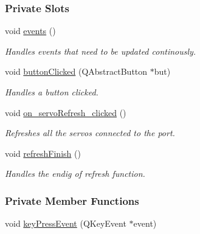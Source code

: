 \subsubsection*{Private Slots}
\begin{DoxyCompactItemize}
\item 
void \hyperlink{a00006_a18763ff318688083c7ee5a21f22e8e98}{events} ()
\begin{DoxyCompactList}\small\item\em Handles events that need to be updated continously. \end{DoxyCompactList}\item 
void \hyperlink{a00006_a1f7d6790701ff9b1301533b8ad045ede}{button\+Clicked} (Q\+Abstract\+Button $\ast$but)
\begin{DoxyCompactList}\small\item\em Handles a button clicked. \end{DoxyCompactList}\item 
void \hyperlink{a00006_ad5365d452e8bcd86cbb64b9ec42c3b7e}{on\+\_\+servo\+Refresh\+\_\+clicked} ()
\begin{DoxyCompactList}\small\item\em Refreshes all the servos connected to the port. \end{DoxyCompactList}\item 
void \hyperlink{a00006_ae52f8ca70b1bfa4c8d21d25e49e309d7}{refresh\+Finish} ()
\begin{DoxyCompactList}\small\item\em Handles the endig of refresh function. \end{DoxyCompactList}\end{DoxyCompactItemize}
\subsubsection*{Private Member Functions}
\begin{DoxyCompactItemize}
\item 
void \hyperlink{a00006_aae43fcdcc9941fbce40c35c449bfd39e}{key\+Press\+Event} (Q\+Key\+Event $\ast$event)
\end{DoxyCompactItemize}
